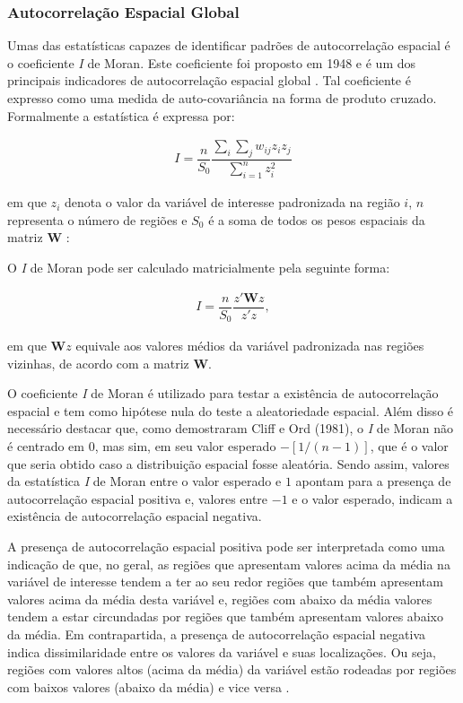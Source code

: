 \documentclass[12pt,a4paper]{article}
\begin{document}
\subsubsection{Autocorrelação Espacial Global}

Umas das estatísticas capazes de identificar padrões de autocorrelação espacial é o coeficiente \textit{I} de Moran. Este coeficiente foi proposto em 1948 e é um dos principais indicadores de autocorrelação espacial global \cite{almeida12_2}. Tal coeficiente é expresso como uma medida de auto-covariância na forma de produto cruzado. Formalmente a estatística é expressa por:
	
\begin{align}\label{IMoran_2}
    I = \dfrac{n}{S_0} \dfrac{\sum_{i} \sum_{j} w_{ij} z_i z_j}{\sum_{i=1}^{n} z_i^2}
\end{align}
	
\noindent em que $z_i$ denota o valor da variável de interesse padronizada na região $i$, $n$ representa o número de regiões e $S_0$ é a soma de todos os pesos espaciais da matriz $\boldsymbol{W}$ \cite{almeida12_2}:
	
O \textit{I} de Moran pode ser calculado matricialmente pela seguinte forma:
	
\begin{align*}
	I = \dfrac{n}{S_0} \dfrac{z'\boldsymbol{W}z}{z'z},
\end{align*}
	
\noindent em que $\boldsymbol{W}z$ equivale aos valores médios da variável padronizada nas regiões vizinhas, de acordo com a matriz $\boldsymbol{W}$.

O coeficiente \textit{I} de Moran é utilizado para testar a existência de autocorrelação espacial e tem como hipótese nula do teste a aleatoriedade espacial. Além disso é necessário destacar que, como demostraram Cliff e Ord (1981), o \textit{I} de Moran não é centrado em $0$, mas sim, em seu valor esperado $-[1/(n-1)]$, que é o valor que seria obtido caso a distribuição espacial fosse aleatória. Sendo assim, valores da estatística \textit{I} de Moran entre o valor esperado e $1$ apontam para a presença de autocorrelação espacial positiva e, valores entre $-1$ e o valor esperado, indicam a existência de autocorrelação espacial negativa. 
	
A presença de autocorrelação espacial positiva pode ser interpretada como uma indicação de que, no geral, as regiões que apresentam valores acima da média na variável de interesse tendem a ter ao seu redor regiões que também apresentam valores acima da média desta variável e, regiões com abaixo da média valores tendem a estar circundadas por regiões que também apresentam valores abaixo da média. Em contrapartida, a presença de autocorrelação espacial negativa indica dissimilaridade entre os valores da variável e suas localizações. Ou seja, regiões com valores altos (acima da média) da variável estão rodeadas por regiões com baixos valores (abaixo da média) e vice versa \cite{almeida12_2}. 
	
\end{document}
